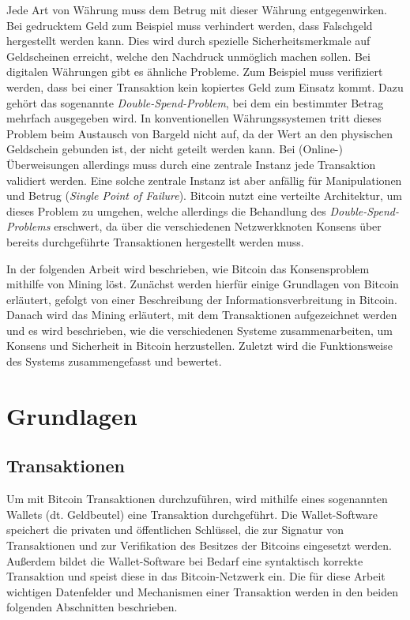 \documentclass[ngerman,runningheads,a4paper]{llncs}[2018/03/10]
\begin{document}
Jede Art von Währung muss dem Betrug mit dieser Währung entgegenwirken. Bei gedrucktem Geld zum Beispiel muss verhindert werden, dass Falschgeld hergestellt werden kann. Dies wird durch spezielle Sicherheitsmerkmale auf Geldscheinen erreicht, welche den Nachdruck unmöglich machen sollen. Bei digitalen Währungen gibt es ähnliche Probleme. Zum Beispiel muss verifiziert werden, dass bei einer Transaktion kein kopiertes Geld zum Einsatz kommt. Dazu gehört das sogenannte \textit{Double-Spend-Problem}, bei dem ein bestimmter Betrag mehrfach ausgegeben wird. In konventionellen Währungssystemen tritt dieses Problem beim Austausch von Bargeld nicht auf, da der Wert an den physischen Geldschein gebunden ist, der nicht geteilt werden kann. Bei (Online-) Überweisungen allerdings muss durch eine zentrale Instanz jede Transaktion validiert werden. Eine solche zentrale Instanz ist aber anfällig für Manipulationen und Betrug (\textit{Single Point of Failure}). Bitcoin nutzt eine verteilte Architektur, um dieses Problem zu umgehen, welche allerdings die Behandlung des \textit{Double-Spend-Problems} erschwert, da über die verschiedenen Netzwerkknoten Konsens über bereits durchgeführte Transaktionen hergestellt werden muss. 

In der folgenden Arbeit wird beschrieben, wie Bitcoin das Konsensproblem mithilfe von Mining löst. Zunächst werden hierfür einige Grundlagen von Bitcoin erläutert, gefolgt von einer Beschreibung der Informationsverbreitung in Bitcoin. Danach wird das Mining erläutert, mit dem Transaktionen aufgezeichnet werden und es wird beschrieben, wie die verschiedenen Systeme zusammenarbeiten, um Konsens und Sicherheit in Bitcoin herzustellen. Zuletzt wird die Funktionsweise des Systems zusammengefasst und bewertet.

\section{Grundlagen}\label{sec:grundlagen}

\subsection{Transaktionen}\label{sec:transaktionen}

Um mit Bitcoin Transaktionen durchzuführen, wird mithilfe eines sogenannten Wallets (dt. Geldbeutel) eine Transaktion durchgeführt. Die Wallet-Software speichert die privaten und öffentlichen Schlüssel, die zur Signatur von Transaktionen und zur Verifikation des Besitzes der Bitcoins eingesetzt werden. Außerdem bildet die Wallet-Software bei Bedarf eine syntaktisch korrekte Transaktion und speist diese in das Bitcoin-Netzwerk ein. Die für diese Arbeit wichtigen Datenfelder und Mechanismen einer Transaktion werden in den beiden folgenden Abschnitten beschrieben.
\end{document}
